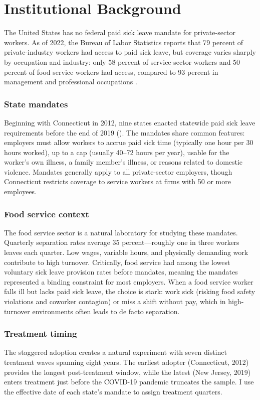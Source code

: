 \documentclass[12pt]{article}
\begin{document}
\section{Institutional Background}\label{sec:background}

The United States has no federal paid sick leave mandate for private-sector workers. As of 2022, the Bureau of Labor Statistics reports that 79 percent of private-industry workers had access to paid sick leave, but coverage varies sharply by occupation and industry: only 58 percent of service-sector workers and 50 percent of food service workers had access, compared to 93 percent in management and professional occupations \citep{BLS2023EB}.

\subsubsection*{State mandates} Beginning with Connecticut in 2012, nine states enacted statewide paid sick leave requirements before the end of 2019 (). The mandates share common features: employers must allow workers to accrue paid sick time (typically one hour per 30 hours worked), up to a cap (usually 40--72 hours per year), usable for the worker's own illness, a family member's illness, or reasons related to domestic violence. Mandates generally apply to all private-sector employers, though Connecticut restricts coverage to service workers at firms with 50 or more employees.

\subsubsection*{Food service context} The food service sector is a natural laboratory for studying these mandates. Quarterly separation rates average 35 percent---roughly one in three workers leaves each quarter. Low wages, variable hours, and physically demanding work contribute to high turnover. Critically, food service had among the lowest voluntary sick leave provision rates before mandates, meaning the mandates represented a binding constraint for most employers. When a food service worker falls ill but lacks paid sick leave, the choice is stark: work sick (risking food safety violations and coworker contagion) or miss a shift without pay, which in high-turnover environments often leads to de facto separation.

\subsubsection*{Treatment timing} The staggered adoption creates a natural experiment with seven distinct treatment waves spanning eight years. The earliest adopter (Connecticut, 2012) provides the longest post-treatment window, while the latest (New Jersey, 2019) enters treatment just before the COVID-19 pandemic truncates the sample. I use the effective date of each state's mandate to assign treatment quarters.
\end{document}
